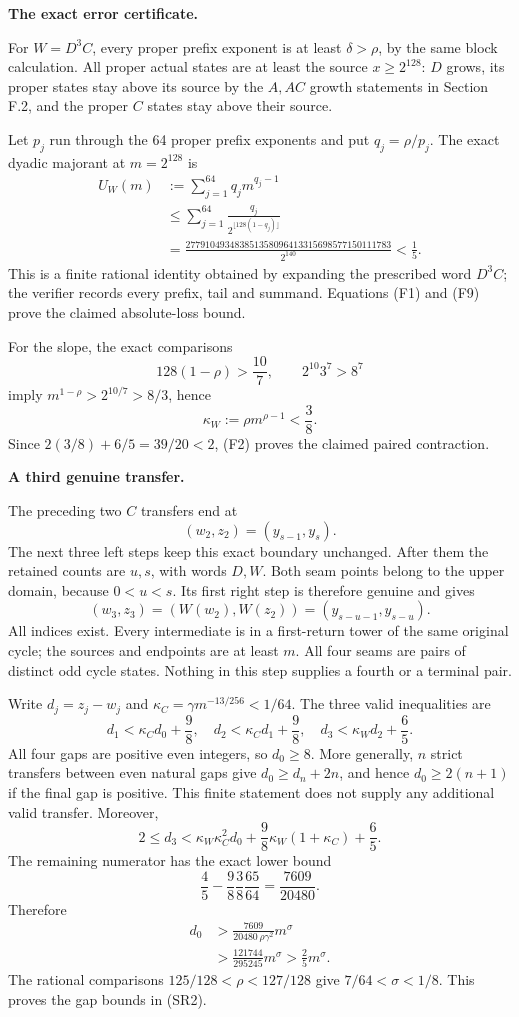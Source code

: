 \documentclass[12pt]{article}
\begin{document}
\textbf{The exact error certificate.}

For \(W=D^3C\), every proper prefix exponent is at least
\(\delta>\rho\), by the same block calculation. All proper actual states
are at least the source \(x\ge2^{128}\): \(D\) grows, its proper states
stay above its source by the \(A,AC\) growth statements in Section F.2,
and the proper \(C\) states stay above their source.

Let \(p_j\) run through the 64 proper prefix exponents and put
\(q_j=\rho/p_j\). The exact dyadic majorant at \(m=2^{128}\) is \[
\begin{aligned}
U_W(m)&:=\sum_{j=1}^{64}q_jm^{q_j-1}\\
&\le\sum_{j=1}^{64}
       \frac{q_j}{2^{\lfloor128(1-q_j)\rfloor}}\\
&=\frac{277910493483851358096413315698577150111783}{2^{140}}
 <\frac15.
\end{aligned}
\tag{F9}
\] This is a finite rational identity obtained by expanding the
prescribed word \(D^3C\); the verifier records every prefix, tail and
summand. Equations (F1) and (F9) prove the claimed absolute-loss bound.

For the slope, the exact comparisons \[
128(1-\rho)>\frac{10}{7},\qquad
2^{10}3^7>8^7
\] imply \(m^{1-\rho}>2^{10/7}>8/3\), hence \[
\kappa_W:=\rho m^{\rho-1}<\frac38.
\] Since \(2(3/8)+6/5=39/20<2\), (F2) proves the claimed paired
contraction.

\textbf{A third genuine transfer.}

The preceding two \(C\) transfers end at \[
(w_2,z_2)=(y_{s-1},y_s).
\] The next three left steps keep this exact boundary unchanged. After
them the retained counts are \(u,s\), with words \(D,W\). Both seam
points belong to the upper domain, because \(0<u<s\). Its first right
step is therefore genuine and gives \[
(w_3,z_3)=(W(w_2),W(z_2))
          =(y_{s-u-1},y_{s-u}).
\tag{F10}
\] All indices exist. Every intermediate is in a first-return tower of
the same original cycle; the sources and endpoints are at least \(m\).
All four seams are pairs of distinct odd cycle states. Nothing in this
step supplies a fourth or a terminal pair.

Write \(d_j=z_j-w_j\) and \(\kappa_C=\gamma m^{-13/256}<1/64\). The
three valid inequalities are \[
d_1<\kappa_Cd_0+\frac98,\quad
d_2<\kappa_Cd_1+\frac98,\quad
d_3<\kappa_Wd_2+\frac65.
\] All four gaps are positive even integers, so \(d_0\ge8\). More
generally, \(n\) strict transfers between even natural gaps give
\(d_0\ge d_n+2n\), and hence \(d_0\ge2(n+1)\) if the final gap is
positive. This finite statement does not supply any additional valid
transfer. Moreover, \[
2\le d_3<
\kappa_W\kappa_C^2d_0+
\frac98\kappa_W(1+\kappa_C)+\frac65.
\] The remaining numerator has the exact lower bound \[
\frac45-\frac98\frac38\frac{65}{64}
=\frac{7609}{20480}.
\] Therefore \[
\begin{aligned}
d_0&>\frac{7609}{20480\,\rho\gamma^2}m^\sigma\\
&>\frac{121744}{295245}m^\sigma
 >\frac25m^\sigma.
\end{aligned}
\] The rational comparisons \(125/128<\rho<127/128\) give
\(7/64<\sigma<1/8\). This proves the gap bounds in (SR2).
\end{document}
